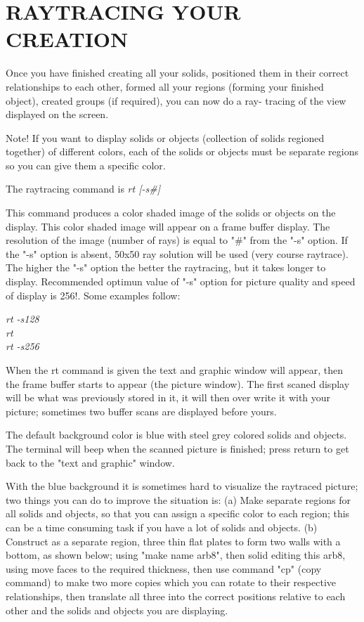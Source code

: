 \chapter{RAYTRACING YOUR CREATION}

Once you have finished creating all your solids, positioned them in
their correct relationships to each other, formed all your regions (forming
your finished object), created groups (if required), you can now do a ray-
tracing of the view displayed on the screen.

Note!  If you want to display solids or objects (collection of solids
regioned together) of different colors, each of the solids or objects must be
separate regions so you can give them a specific color.

The raytracing command is
{\em\center
  rt [-s\#]
}

This command produces a color shaded image of the solids or objects on
the display.  This color shaded image  will appear on a frame buffer display.
The resolution of the image (number of rays) is equal to "\#" from the "-s"
option.  If the "-s" option is absent, 50x50 ray solution will be used (very
course raytrace).  The higher the "-s" option the better the raytracing, but
it takes longer to display.
Recommended optimun value of "-s" option for picture
quality and speed of display is 256!.  Some examples follow:

{\em
             rt -s128 \\
             rt \\
             rt -s256 \\
}

When the rt command is given the text and graphic window will appear,
then the frame buffer starts to appear (the picture window).  The first scaned
display will be what was previously stored in it, it will then over write it
with your picture; sometimes two buffer scans are displayed before yours.

The default background color is blue with steel grey colored solids and 
objects.  The terminal will beep when the scanned picture is finished; press
return to get back to the "text and graphic" window.

With the blue background it is sometimes hard to visualize the raytraced
picture; two things you can do to improve the situation is:
     (a)  Make separate regions for all solids and objects, so that you can
assign a specific color to each region; this can be a time consuming task if
you have a lot of solids and objects.
     (b)  Construct as a separate region, three thin flat plates to form two
walls with a bottom, as shown below; using "make name arb8",
then solid editing this arb8, using move faces to the required thickness,
then use command "cp"
(copy command) to make two more copies which you can rotate to their
respective relationships, then translate all three into the correct positions
relative to each other and the solids and objects you are displaying.  

